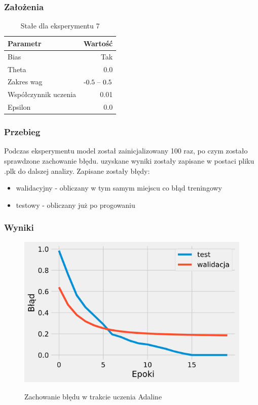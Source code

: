 \documentclass{article}
\begin{document}
\subsubsection*{Założenia}
\begin{table}[!h]
	\caption{Stałe dla eksperymentu 7}
	\label{tabela-const-7}
	\centering
	\begin{tabular}{lr}
		\toprule
		Parametr               & Wartość         \\
		\midrule
		Bias                   & Tak               \\
		Theta                  & 0.0               \\
		Zakres wag             & \($-0.5 -- 0.5$\) \\
		Współczynnik uczenia & 0.01              \\
		Epsilon                & 0.0               \\
		\bottomrule
	\end{tabular}
\end{table}
\subsubsection*{Przebieg}

Podczas eksperymentu model został zainicjalizowany 100 raz, po czym zostało sprawdzone zachowanie błędu. uzyskane wyniki zostały zapisane w postaci pliku .plk do dalszej analizy. Zapisane zostały błędy:
\begin{itemize}
	\item walidacyjny - obliczany w tym samym miejscu co błąd treningowy
	\item testowy - obliczany już po progowaniu
\end{itemize}

\subsubsection*{Wyniki}

\begin{figure}[!h]
	\centering
	\caption{Zachowanie błędu w trakcie uczenia Adaline}
	\includegraphics[width=.5\textwidth]{ada_epsilon.png}
	\label{fig:res7}
\end{figure}
\end{document}

